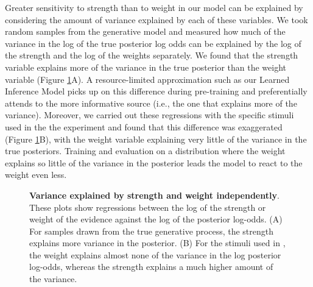 Greater sensitivity to strength than to weight in our model can be explained by considering the amount of variance explained by each of these variables. We took random samples from the generative model and measured how much of the variance in the log of the true posterior log odds can be explained by the log of the strength and the log of the weights separately. We found that the strength variable explains more of the variance in the true posterior than the weight variable (Figure \ref{fig:GTR2}A). A resource-limited approximation such as our Learned Inference Model picks up on this difference during pre-training and preferentially attends to the more informative source (i.e., the one that explains more of the variance). Moreover, we carried out these regressions with the specific stimuli used in the the experiment and found that this difference was exaggerated (Figure \ref{fig:GTR2}B), with the weight variable explaining very little of the variance in the true posteriors. Training and evaluation on a distribution where the weight explains so little of the variance in the posterior leads the model to react to the weight even less.

\begin{figure}
\centering
\captionsetup[subfigure]{justification=centering}
      \hfill
  \caption{\textbf{Variance explained by strength and weight independently}. These plots show regressions between the log of the strength or weight of the evidence against the log of the posterior log-odds. (A) For samples drawn from the true generative process, the strength explains more variance in the posterior. (B) For the stimuli used in \cite{griffin1992weighing}, the weight explains almost none of the variance in the log posterior log-odds, whereas the strength explains a much higher amount of the variance.
  } 
  \label{fig:GTR2}
\end{figure}

